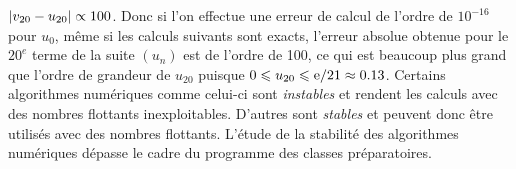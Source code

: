 \documentclass{magnoliaold}
\begin{document}
$\left|v_{20}-u_{20}\right|\propto 100$. Donc si l'on effectue une erreur de calcul de l'ordre de
$10^{-16}$ pour $u_0$, même si les calculs suivants sont exacts, l'erreur absolue
obtenue pour le $20^e$ terme de la suite $(u_n)$ est de l'ordre de 100, ce qui
est beaucoup plus grand que l'ordre de grandeur de $u_{20}$ puisque $0\leqslant u_{20}\leqslant {\rm e}/21\approx 0.13$. Certains
algorithmes numériques comme celui-ci sont \emph{instables} et rendent les calculs avec
des nombres flottants inexploitables. D'autres sont \emph{stables} et peuvent donc
être utilisés avec des nombres flottants. L'étude de la stabilité des algorithmes
numériques dépasse le cadre du programme des classes préparatoires.





\end{document}
